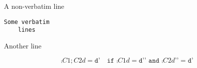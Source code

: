 \documentclass{article}
\begin{document}
\thispagestyle{empty}

\noindent A non-verbatim line
\begin{Verbatim}[xleftmargin=.5in]
Some verbatim
	lines
\end{Verbatim}
\noindent Another line

 \[
       \comp{C1 ; C2}{d} = \mathtt{d’} \quad
        \texttt{if $\comp{C1}{d} = \mathtt{d’’}$ and
                   $\comp{C2}{d’’} = \mathtt{d’}$}
\]
\end{document}
